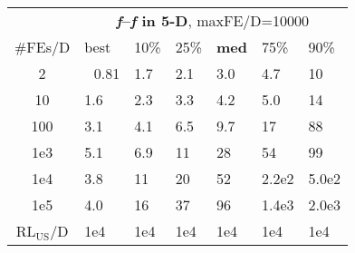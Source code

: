 \begin{tabular}{c|llllll}
 & \multicolumn{6}{|c}{\textbf{\textit{f}\raisebox{-0.35ex}{1}--\textit{f}\raisebox{-0.35ex}{24} in 5-D}, maxFE/D=10000}\\
\#FEs/D & best & 10\% & 25\% & \textbf{med} & 75\% & 90\%\\
2 & ~\,0.81 & \hspace*{1ex}1.7 & \hspace*{1ex}2.1 & \hspace*{1ex}3.0 & \hspace*{1ex}4.7 & 10\\
10 & \hspace*{1ex}1.6 & \hspace*{1ex}2.3 & \hspace*{1ex}3.3 & \hspace*{1ex}4.2 & \hspace*{1ex}5.0 & 14\\
100 & \hspace*{1ex}3.1 & \hspace*{1ex}4.1 & \hspace*{1ex}6.5 & \hspace*{1ex}9.7 & 17 & 88\\
1e3 & \hspace*{1ex}5.1 & \hspace*{1ex}6.9 & 11 & 28 & 54 & 99\\
1e4 & \hspace*{1ex}3.8 & 11 & 20 & 52 & 2.2e2 & 5.0e2\\
1e5 & \hspace*{1ex}4.0 & 16 & 37 & 96 & 1.4e3 & 2.0e3\\
$\text{RL}_{\text{US}}$/D & 1e4 & 1e4 & 1e4 & 1e4 & 1e4 & 1e4
\end{tabular}
